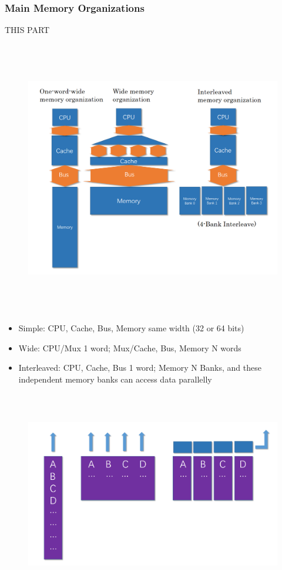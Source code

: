 \documentclass[12pt, a4paper]{article}
\theoremstyle{margin}
\begin{document}
		\subsubsection{Main Memory Organizations}
			THIS PART\cite{ppt}
		  \begin{figure}[H]
				\begin{center}
				  \includegraphics[height=12cm]{images/memory-organizations.png}
				\end{center}
		  \end{figure}
			\begin{itemize}
				\item Simple: CPU, Cache, Bus, Memory same width (32 or 64 bits)
				\item Wide: CPU/Mux 1 word; Mux/Cache, Bus, Memory N words
				\item Interleaved: CPU, Cache, Bus 1 word; Memory N Banks, and these independent memory banks can access data parallelly
			\end{itemize}
			\begin{figure}[H]
				\begin{center}
				  \includegraphics[height=9cm]{images/memory-organization-data.png}
				\end{center}
		  \end{figure}
\end{document}
